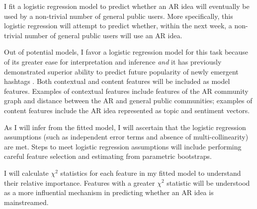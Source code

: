 \documentclass[acmlarge, screen, authorversion]{acmart}
\begin{document}
I fit a logistic regression model to predict whether an AR idea will eventually
be used by a non-trivial number of general public users. More specifically, this
logistic regression will attempt to predict whether, within the next week, a
non-trivial number of general public users will use an AR idea.

Out of potential models, I favor a logistic regression model for this task
because of its greater ease for interpretation and inference \textit{and} it has
previously demonstrated superior ability to predict future popularity of newly
emergent hashtags \cite{maPredictingPopularityNewly2013}. Both contextual and
content features will be included as model features. Examples of contextual
features include features of the AR community graph and distance between the AR
and general public communities; examples of content features include the AR idea
represented as topic and sentiment vectors.

As I will infer from the fitted model, I will ascertain that the logistic
regression assumptions (such as independent error terms and absence of
multi-collinearity) are met. Steps to meet logistic regression assumptions will
include performing careful feature selection and estimating from parametric
bootstraps.

I will calculate $\chi^2$ statistics for each feature in my fitted model to
understand their relative importance. Features with a greater $\chi^2$ statistic
will be understood as a more influential mechanism in predicting whether an AR
idea is mainstreamed.
\end{document}
